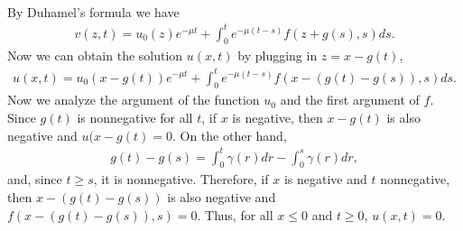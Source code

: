 \begin{questions}
\begin{solution}
\begin{align*}
\end{align*}
By Duhamel's formula we have
\begin{align*}
v(z,t)=u_0(z)e^{-\mu t}+\int_0^te^{-\mu(t-s)}f(z+g(s),s)ds.
\end{align*}
Now we can obtain the solution $u(x,t)$ by plugging in $z=x-g(t)$,
\begin{align*}
u(x,t)=u_0(x-g(t))e^{-\mu t}+\int_0^te^{-\mu(t-s)}f(x-\left(g(t)-g(s)\right),s)ds.
\end{align*}
Now we analyze the argument of the function $u_0$ and the first argument of $f$. Since $g(t)$ is nonnegative for all $t$, if $x$ is negative, then $x-g(t)$ is also negative and $u(x-g(t)=0$. On the other hand,
\begin{align*}
g(t)-g(s)=\int_0^t\gamma(r)dr-\int_0^s\gamma(r)dr,
\end{align*}
and, since $t\geq s$, it is nonnegative. Therefore, if $x$ is negative and $t$ nonnegative, then $x-(g(t)-g(s))$ is also negative and $f(x-(g(t)-g(s)),s)=0$. Thus, for all $x\leq 0$ and $t\geq 0$, $u(x,t)=0$.
\end{solution}
\end{questions}